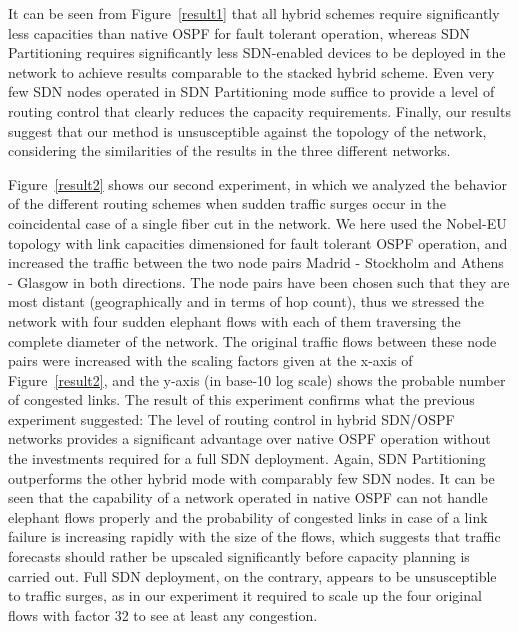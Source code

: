 \documentclass[10pt, conference]{IEEEtran}
\begin{document}
It can be seen from Figure~\ref{result1} that all hybrid schemes require significantly less capacities than native OSPF for fault tolerant operation, whereas SDN Partitioning requires significantly less SDN-enabled devices to be deployed in the network to achieve results comparable to the stacked hybrid scheme. Even very few SDN nodes operated in SDN Partitioning mode suffice to provide a level of routing control that clearly reduces the capacity requirements. Finally, our results suggest that our method is unsusceptible against the topology of the network, considering the similarities of the results in the three different networks.

Figure~\ref{result2} shows our second experiment, in which we analyzed the behavior of the different routing schemes when sudden traffic surges occur in the coincidental case of a single fiber cut in the network. We here used the Nobel-EU topology with link capacities dimensioned for fault tolerant OSPF operation, and increased the traffic between the two node pairs Madrid - Stockholm and Athens - Glasgow in both directions. The node pairs have been chosen such that they are most distant (geographically and in terms of hop count), thus we stressed the network with four sudden elephant flows with each of them traversing the complete diameter of the network. The original traffic flows between these node pairs were increased with the scaling factors given at the x-axis of Figure~\ref{result2}, and the y-axis (in base-10 log scale) shows the probable number of congested links. The result of this experiment confirms what the previous experiment suggested: The level of routing control in hybrid SDN/OSPF networks provides a significant advantage over native OSPF operation without the investments required for a full SDN deployment. Again, SDN Partitioning outperforms the other hybrid mode with comparably few SDN nodes. It can be seen that the capability of a network operated in native OSPF can not handle elephant flows properly and the probability of congested links in case of a link failure is increasing rapidly with the size of the flows, which suggests that traffic forecasts should rather be upscaled significantly before capacity planning is carried out. Full SDN deployment, on the contrary, appears to be unsusceptible  to traffic surges, as in our experiment it required to scale up the four original flows with factor 32 to see at least any congestion.
\end{document}
